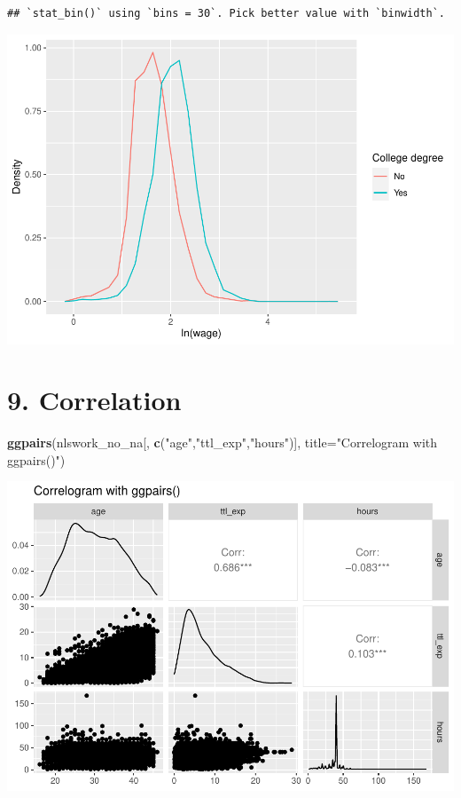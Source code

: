 \documentclass[
]{article}
\newenvironment{Shaded}{\begin{snugshade}}{\end{snugshade}}
\newcommand{\AttributeTok}[1]{\textcolor[rgb]{0.13,0.29,0.53}{#1}}
\newcommand{\FunctionTok}[1]{\textcolor[rgb]{0.13,0.29,0.53}{\textbf{#1}}}
\newcommand{\NormalTok}[1]{#1}
\newcommand{\StringTok}[1]{\textcolor[rgb]{0.31,0.60,0.02}{#1}}
\begin{document}
\begin{verbatim}
## `stat_bin()` using `bins = 30`. Pick better value with `binwidth`.
\end{verbatim}

\includegraphics{RIntro_files/figure-latex/unnamed-chunk-23-1.pdf}

\hypertarget{correlation}{%
\section{9. Correlation}\label{correlation}}

\begin{Shaded}
\begin{Highlighting}[]
\FunctionTok{ggpairs}\NormalTok{(nlswork\_no\_na[, }\FunctionTok{c}\NormalTok{(}\StringTok{"age"}\NormalTok{,}\StringTok{"ttl\_exp"}\NormalTok{,}\StringTok{"hours"}\NormalTok{)], }\AttributeTok{title=}\StringTok{"Correlogram with ggpairs()"}\NormalTok{)}
\end{Highlighting}
\end{Shaded}

\includegraphics{RIntro_files/figure-latex/unnamed-chunk-24-1.pdf}
\end{document}
